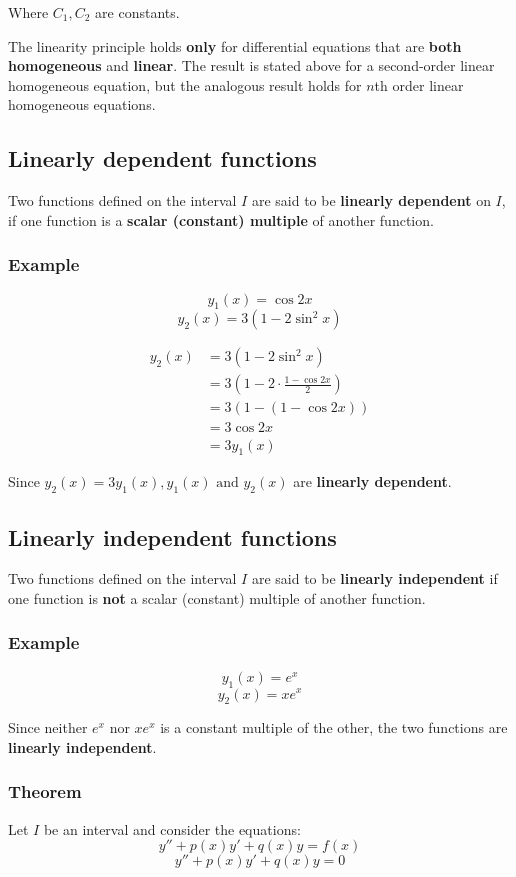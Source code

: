 \documentclass[11pt]{article}
\begin{document}
Where \(C_1, C_2\) are constants.


The linearity principle holds \textbf{only} for differential equations that are \textbf{both homogeneous} and \textbf{linear}. The result is stated above for a second-order linear homogeneous equation, but the analogous result holds for \(n\)th order linear homogeneous equations.

\newpage
\subsection{Linearly dependent functions}
\label{sec:orge1f1de2}
Two functions defined on the interval \(I\) are said to be \textbf{linearly dependent} on \(I\), if one function is a \textbf{scalar (constant) multiple} of another function.
\subsubsection{Example}
\label{sec:orgeaa423c}
\[y_1(x) = \cos 2x\]
\[y_2(x) = 3(1 - 2 \sin^2 x)\]

\begin{align*}
y_2(x) &= 3 (1 - 2 \sin^2 x) \\
&= 3 \left( 1 - 2 \cdot \frac{1 - \cos 2x}{2} \right) \\
&= 3 (1 - (1 - \cos 2x)) \\
&= 3 \cos 2x \\
&= 3y_1(x)
\end{align*}

Since \(y_2(x) = 3y_1(x), y_1(x) \text{ and } y_2(x)\) are \textbf{linearly dependent}.

\newpage
\subsection{Linearly independent functions}
\label{sec:orgfd91929}
Two functions defined on the interval \(I\) are said to be \textbf{linearly independent} if one function is \textbf{not} a scalar (constant) multiple of another function.
\subsubsection{Example}
\label{sec:orgabc616e}
\[y_1(x) = e^x\]
\[y_2(x) = xe^x\]

Since neither \(e^x\) nor \(xe^x\) is a constant multiple of the other, the two functions are \textbf{linearly independent}.
\subsubsection{Theorem}
\label{sec:org816689a}
Let \(I\) be an interval and consider the equations:
\[y'' + p(x)y' + q(x)y = f(x) \tag{3}\]
\[y'' + p(x)y' + q(x)y = 0 \tag{4}\]
\end{document}
